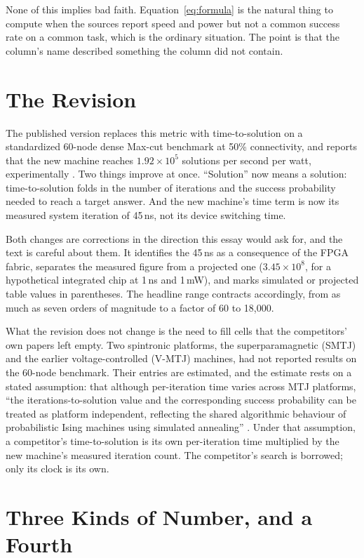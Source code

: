 \documentclass[11pt]{article}
\theoremstyle{definition}
\theoremstyle{remark}
\begin{document}
None of this implies bad faith. Equation~\eqref{eq:formula} is the natural thing to compute when the sources report speed and power but not a common success rate on a common task, which is the ordinary situation. The point is that the column's name described something the column did not contain.

\section{The Revision}

The published version replaces this metric with time-to-solution on a standardized 60-node dense Max-cut benchmark at 50\% connectivity, and reports that the new machine reaches $1.92 \times 10^5$ solutions per second per watt, experimentally \cite{li2026}. Two things improve at once. ``Solution'' now means a solution: time-to-solution folds in the number of iterations and the success probability needed to reach a target answer. And the new machine's time term is now its measured system iteration of 45\,ns, not its device switching time.

Both changes are corrections in the direction this essay would ask for, and the text is careful about them. It identifies the 45\,ns as a consequence of the FPGA fabric, separates the measured figure from a projected one ($3.45 \times 10^8$, for a hypothetical integrated chip at 1\,ns and 1\,mW), and marks simulated or projected table values in parentheses. The headline range contracts accordingly, from as much as seven orders of magnitude to a factor of 60 to 18,000.

What the revision does not change is the need to fill cells that the competitors' own papers left empty. Two spintronic platforms, the superparamagnetic (SMTJ) and the earlier voltage-controlled (V-MTJ) machines, had not reported results on the 60-node benchmark. Their entries are estimated, and the estimate rests on a stated assumption: that although per-iteration time varies across MTJ platforms, ``the iterations-to-solution value and the corresponding success probability can be treated as platform independent, reflecting the shared algorithmic behaviour of probabilistic Ising machines using simulated annealing'' \cite{li2026}. Under that assumption, a competitor's time-to-solution is its own per-iteration time multiplied by the new machine's measured iteration count. The competitor's search is borrowed; only its clock is its own.

\section{Three Kinds of Number, and a Fourth}
\end{document}

